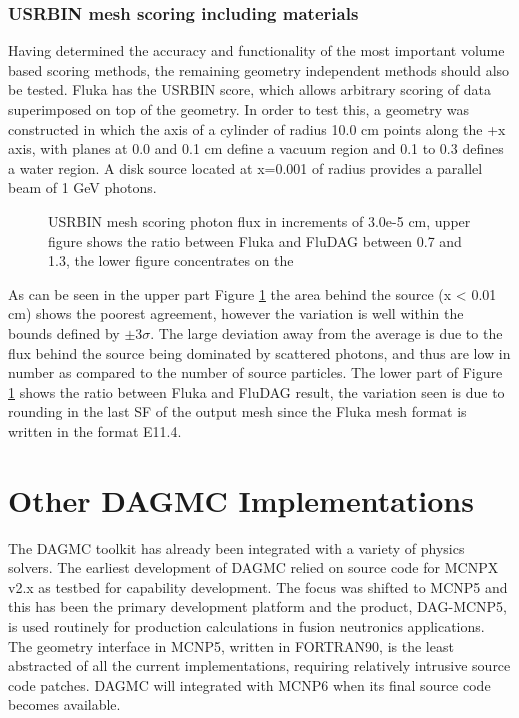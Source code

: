 \documentclass{anstrans}
\begin{document}
\subsubsection*{USRBIN mesh scoring including materials}
Having determined the accuracy and functionality of the most important 
volume based scoring methods, the remaining geometry independent methods
should also be tested.
Fluka has the USRBIN score, which allows arbitrary scoring
of data superimposed on top of the geometry. In order to test this, a geometry
was constructed in which the axis of a cylinder of radius 10.0 cm points along the
+x axis, with planes at 0.0 and 0.1 cm define a vacuum region and 0.1 to 0.3 
defines a water region. A disk  source located at x=0.001 of radius provides a 
parallel beam of 1 GeV photons.
\begin{figure}[h!]
	\begin{center}
		\caption{USRBIN mesh scoring photon flux in increments
                  of 3.0e-5 cm, upper figure shows the ratio between
                  Fluka and FluDAG between 0.7 and 1.3, the lower
                  figure concentrates on the }
	\end{center}
	\label{mesh_phot}
\end{figure}
As can be seen in the upper part Figure \ref{mesh_phot} the area behind the source 
(x < 0.01 cm) shows the poorest agreement, however the variation is well within the 
bounds defined by $\pm 3\sigma$. The large deviation away from the average is due to 
the flux behind the source being dominated by scattered photons, and thus are low in 
number as compared to the number of source particles.  The lower part of Figure 
\ref{mesh_phot} shows the ratio between Fluka and FluDAG result, the variation seen is 
due to rounding in the last SF of the output mesh since the Fluka mesh format is written 
 in the format E11.4. 

\section{Other DAGMC Implementations}

The DAGMC toolkit has already been integrated with a variety of
physics solvers.  The earliest development of DAGMC relied on source
code for MCNPX v2.x as testbed for capability development.  The focus
was shifted to MCNP5 and this has been the primary development
platform and the product, DAG-MCNP5, is used routinely for production
calculations in fusion neutronics applications.  The geometry
interface in MCNP5, written in FORTRAN90, is the least abstracted of
all the current implementations, requiring relatively intrusive source
code patches.  DAGMC will integrated with MCNP6 when its final source
code becomes available.
\end{document}
